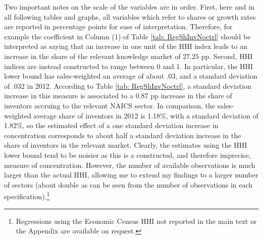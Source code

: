 Two important notes on the scale of the variables are in order. First,
here and in all following tables and graphs, all variables which refer
to shares or growth rates are reported in percentage points for ease
of interpretation. Therefore, for example the coefficient in Column
(1) of Table \ref{tab: RegShInvNoctrl} should be interpreted as saying
that an increase in one unit of the HHI index leads to an increase
in the share of the relevant knowledge market of $27.25$ pp. Second,
HHI indices are instead constructed to range between 0 and 1. In particular,
the HHI lower bound has sales-weighted an average of about .03, and
a standard deviation of .032 in 2012. According to Table \ref{tab: RegShInvNoctrl},
a standard deviation increase in this measure is associated to a 0.87
pp increase in the share of inventors accruing to the relevant NAICS
sector. In comparison, the sales-weighted average share of inventors
in 2012 is 1.18\%, with a standard deviation of 1.82\%, so the estimated
effect of a one standard deviation increase in concentration corresponds
to about half a standard deviation increase in the share of inventors
in the relevant market. Clearly, the estimates using the HHI lower
bound tend to be noisier as this is a constructed, and therefore imprecise,
measure of concentration. However, the number of available observations
is much larger than the actual HHI, allowing me to extend my findings
to a larger number of sectors (about double as can be seen from the
number of observations in each specification).\footnote{Regressions using the Economic Census HHI not reported in the main
text or the Appendix are available on request.}

